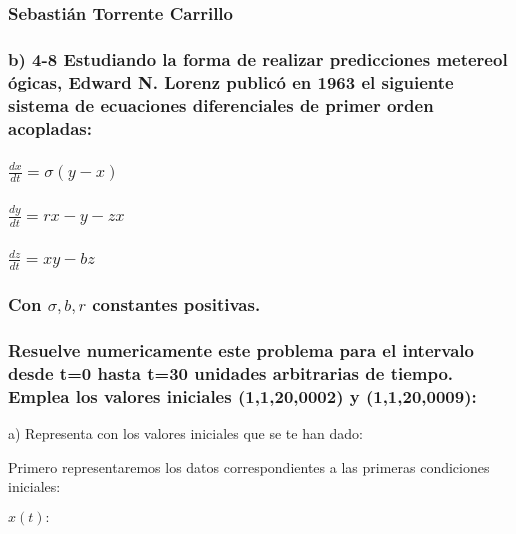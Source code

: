 \documentclass[12pt,thmsa]{article}
\begin{document}
\subsubsection{\protect\vspace{1pt}Sebasti\'{a}n Torrente Carrillo}

\subsubsection{b) 4-8 Estudiando la forma de realizar predicciones metereol%
\'{o}gicas, Edward N. Lorenz public\'{o} en 1963 el siguiente sistema de
ecuaciones diferenciales de primer orden acopladas:}

\subsubsection{$\frac{dx}{dt}=\sigma (y-x)$}

\subsubsection{$\frac{dy}{dt}=rx-y-zx$}

\subsubsection{$\frac{dz}{dt}=xy-bz$}

\subsubsection{Con $\sigma ,b,r$ constantes positivas.}

\subsubsection{Resuelve numericamente este problema para el intervalo desde
t=0 hasta t=30 unidades arbitrarias de tiempo. Emplea los valores iniciales
(1,1,20,0002) y (1,1,20,0009):}

\vspace{1pt}

a) Representa con los valores iniciales que se te han dado:

Primero representaremos los datos correspondientes a las primeras
condiciones iniciales:

$x(t):$

\end{document}
